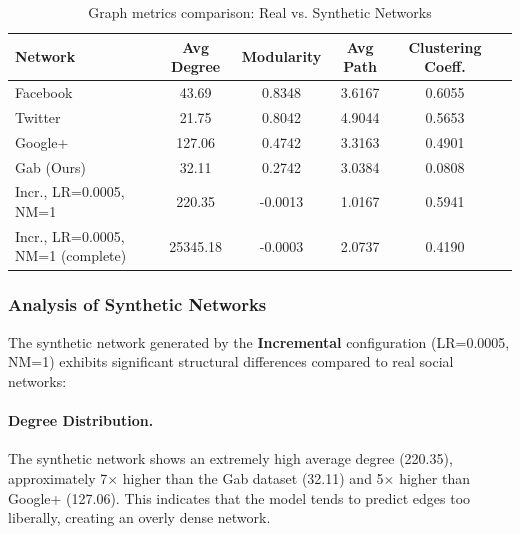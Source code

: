 \begin{table}[h]
	\centering
	\caption{Graph metrics comparison: Real vs. Synthetic Networks}
	\label{tab:graph_metrics}
	\begin{tabular}{lccccc}
		\toprule
		\textbf{Network}                             & \textbf{Avg Degree} & \textbf{Modularity} & \textbf{Avg Path} & \textbf{Clustering Coeff.} \\
		\midrule
		Facebook                                     & 43.69               & 0.8348              & 3.6167            & 0.6055                     \\
		Twitter                                      & 21.75               & 0.8042              & 4.9044            & 0.5653                     \\
		Google+\footnotemark[4]                      & 127.06              & 0.4742              & 3.3163            & 0.4901                     \\
		Gab (Ours)                                   & 32.11               & 0.2742              & 3.0384            & 0.0808                     \\
		\midrule
		\textcolor{drawblue}{Incr.}, LR=0.0005, NM=1 & 220.35              & -0.0013             & 1.0167            & 0.5941                     \\
		\midrule
		\textcolor{drawblue}{Incr.}, LR=0.0005, NM=1 (complete) & 25345.18 & -0.0003             & 2.0737            & 0.4190                     \\
		\bottomrule
	\end{tabular}
\end{table}


\subsubsection*{Analysis of Synthetic Networks}

The synthetic network generated by the \textcolor{drawblue}{\textbf{Incremental}} configuration (LR=0.0005, NM=1) exhibits significant structural differences compared to real social networks:

\paragraph{Degree Distribution.} The synthetic network shows an extremely high average degree (220.35), approximately 7$\times$ higher than the Gab dataset (32.11) and 5$\times$ higher than Google+ (127.06). This indicates that the model tends to predict edges too liberally, creating an overly dense network.

